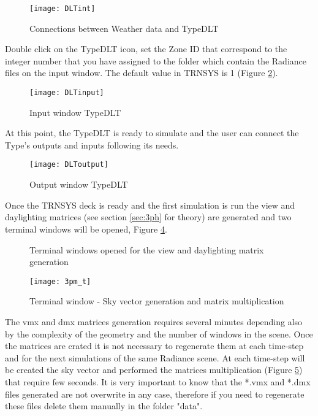 \begin{figure}[h]
\centering
\texttt{[image: DLTint]}
\caption{\label{img5:DLTint} Connections between Weather data and TypeDLT}
\end{figure}


Double click on the TypeDLT icon, set the Zone ID that correspond to the integer number that you have assigned to the folder which contain the Radiance files on the input window. The default value in TRNSYS is 1 (Figure \ref{img5:DLTinput}).

\begin{figure}[h]
\centering
\texttt{[image: DLTinput]}
\caption{\label{img5:DLTinput} Input window TypeDLT }
\end{figure}


At this point, the TypeDLT is ready to simulate and the user can connect the Type's outputs and inputs following its needs.\\
\begin{figure}[h]
\centering
\texttt{[image: DLToutput]}
\caption{\label{img5:DLToutput} Output window TypeDLT }
\end{figure}
Once the TRNSYS deck is ready and the first simulation is run the view and daylighting matrices (see section \ref{sec:3ph} for theory) are generated and two terminal windows will be opened, Figure \ref{img5:matrices}.

\begin{figure}[h] 
\centering
  \caption{\label{img5:matrices} Terminal windows opened for the view and daylighting matrix generation}
\end{figure}

\begin{figure}[H]
\centering
\texttt{[image: 3pm\_t]}
\caption{\label{img5:3pm} Terminal window - Sky vector generation and matrix multiplication }
\end{figure}

The vmx and dmx matrices generation requires several minutes depending also by the complexity of the geometry and the number of windows in the scene. Once the matrices are crated it is not necessary to regenerate them at each time-step and for the next simulations of the same Radiance scene. At each time-step will be created the sky vector and performed the matrices multiplication (Figure \ref{img5:3pm}) that require few seconds.
It is very important to know that the *.vmx and *.dmx files generated are not overwrite in any case, therefore if you need to regenerate these files delete them manually in the folder "data".\\

